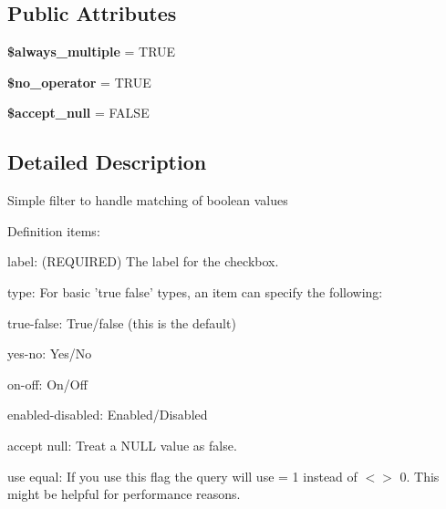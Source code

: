 \subsection*{Public Attributes}
\begin{DoxyCompactItemize}
\item 
\hypertarget{classviews__handler__filter__boolean__operator_a9cb8583474a5a923731acf4406306c30}{
{\bfseries \$always\_\-multiple} = TRUE}
\label{classviews__handler__filter__boolean__operator_a9cb8583474a5a923731acf4406306c30}

\item 
\hypertarget{classviews__handler__filter__boolean__operator_a0ad8e21c2f836e4ade02e9d0c458bc90}{
{\bfseries \$no\_\-operator} = TRUE}
\label{classviews__handler__filter__boolean__operator_a0ad8e21c2f836e4ade02e9d0c458bc90}

\item 
\hypertarget{classviews__handler__filter__boolean__operator_ac6f1cd7c0c2f1108a4678651dd2e437b}{
{\bfseries \$accept\_\-null} = FALSE}
\label{classviews__handler__filter__boolean__operator_ac6f1cd7c0c2f1108a4678651dd2e437b}

\end{DoxyCompactItemize}


\subsection{Detailed Description}
Simple filter to handle matching of boolean values

Definition items:
\begin{DoxyItemize}
\item label: (REQUIRED) The label for the checkbox.
\item type: For basic 'true false' types, an item can specify the following:
\begin{DoxyItemize}
\item true-\/false: True/false (this is the default)
\item yes-\/no: Yes/No
\item on-\/off: On/Off
\item enabled-\/disabled: Enabled/Disabled
\end{DoxyItemize}
\item accept null: Treat a NULL value as false.
\item use equal: If you use this flag the query will use = 1 instead of $<$$>$ 0. This might be helpful for performance reasons. 
\end{DoxyItemize}

